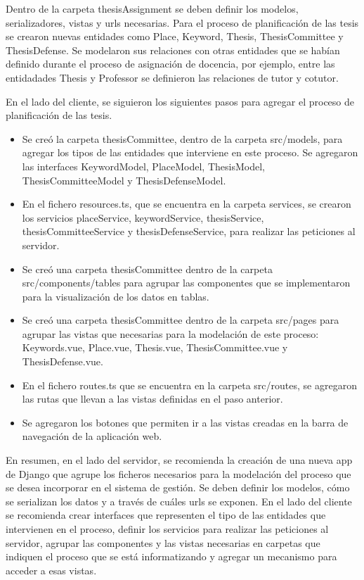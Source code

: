 Dentro de la carpeta thesisAssignment se deben definir los modelos, serializadores, 
vistas y urls necesarias. Para el proceso de planificación de las tesis se crearon nuevas 
entidades como Place, Keyword, Thesis, ThesisCommittee y ThesisDefense. Se modelaron sus
relaciones con otras entidades que se habían definido durante el proceso de asignación de 
docencia, por ejemplo, entre las entidadades Thesis y Professor se definieron las relaciones de tutor y cotutor.

En el lado del cliente, se siguieron los siguientes pasos para agregar el proceso 
de planificación de las tesis. 

\begin{itemize}
    \item Se creó la carpeta thesisCommittee, dentro de la carpeta src/models, para 
    agregar los tipos de las entidades que interviene en este proceso. Se agregaron las interfaces 
    KeywordModel, PlaceModel, ThesisModel, ThesisCommitteeModel y ThesisDefenseModel.
    \item En el fichero resources.ts, que se encuentra en la carpeta services, se crearon los servicios 
    placeService, keywordService, thesisService, thesisCommitteeService y thesisDefenseService, para realizar 
    las peticiones al servidor.
    \item Se creó una carpeta thesisCommittee dentro de la carpeta src/components/tables para agrupar 
    las componentes que se implementaron para la visualización de los datos en tablas. 
    \item Se creó una carpeta thesisCommittee dentro de la carpeta src/pages para agrupar 
    las vistas que necesarias para la modelación de este proceso: Keywords.vue, Place.vue, 
    Thesis.vue, ThesisCommittee.vue y ThesisDefense.vue.
    \item En el fichero routes.ts que se encuentra en la carpeta src/routes, se agregaron las rutas que llevan a las vistas definidas en el paso anterior.
    \item Se agregaron los botones que permiten ir a las vistas creadas en la barra de navegación de la aplicación web.
\end{itemize}


En resumen, en el lado del servidor, se recomienda la creación de una nueva app de Django que agrupe los ficheros necesarios para la modelación del 
proceso que se desea incorporar en el sistema de gestión. Se deben definir los modelos, cómo se serializan los datos y a través de cuáles urls se exponen.
En el lado del cliente se recomienda crear interfaces que representen el tipo de las entidades que intervienen en el proceso, definir los servicios para realizar 
las peticiones al servidor, agrupar las componentes y las vistas necesarias en carpetas que indiquen el proceso que se está informatizando y agregar un mecanismo para 
acceder a esas vistas. 

